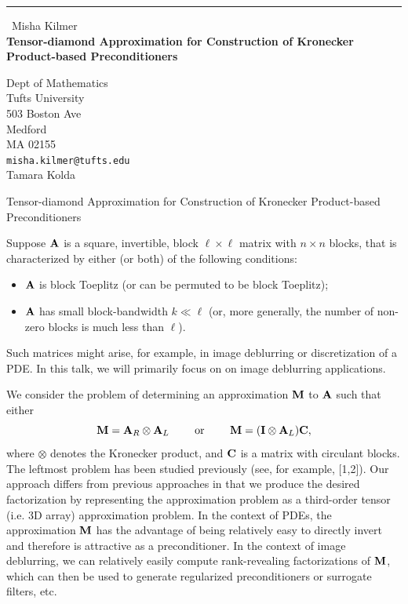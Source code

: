\documentclass{report}
\begin{document}
\begin{center}
\rule{6in}{1pt} \
{\large Misha Kilmer \\
{\bf Tensor-diamond Approximation for Construction of Kronecker Product-based Preconditioners }}

Dept of Mathematics \\ Tufts University \\ 503 Boston Ave \\ Medford \\ MA 02155
\\
{\tt misha.kilmer@tufts.edu}\\
Tamara Kolda\end{center}

\newcommand{\bfA}{{\bf A}}
\newcommand{\bfb}{{\bf b}}
\newcommand{\bfx}{{\bf x}}
\newcommand{\bfe}{{\bf e}}
\newcommand{\bfM}{{\bf M}}

\newcommand{\Mout}{\diamondsuit}


\newcommand{\M}[1]{{\bf {\boldmath {\MakeUppercase{#1}}}}}

\newcommand{\T}[1]{\boldsymbol{\cal {\MakeUppercase{#1}}}}


\newcommand{\TA}{\T{A}}


\begin{center} Tensor-diamond Approximation for Construction of Kronecker
Product-based Preconditioners \end{center}

Suppose $\bfA$ is a square, invertible, block $\ell \times \ell$ matrix
with $n \times n$ blocks, that is characterized by either (or both) of
the following
conditions:
\begin{itemize}
\item $\bfA$ is block Toeplitz (or can be permuted to be block Toeplitz);
\vspace*{-8pt}
\item $\bfA$ has small block-bandwidth $k \ll \ell$ (or, more generally,
the number of non-zero blocks is much less than $\ell$).
\end{itemize}
Such matrices might arise, for example, in image deblurring or
discretization of a PDE. In this talk, we will primarily focus on
on image deblurring applications.

We consider the problem of determining an approximation $\bfM$ to $\bfA$ such that either
\[ \bfM = \bfA_R \otimes \bfA_L \qquad \mbox{ or } \qquad \bfM = (\M{I}
\otimes \bfA_L)\M{C}, \]
where $\otimes$ denotes the Kronecker product, and $\M{C}$ is a matrix
with circulant blocks.
The leftmost problem has been studied previously (see, for example, [1,2]).
Our approach differs from previous approaches in that we produce the
desired factorization by representing
the approximation problem as a third-order tensor (i.e. 3D array) approximation problem.
In the context of PDEs, the approximation $\bfM$ has the advantage of
being relatively easy to directly invert and therefore is attractive as a
preconditioner.
In the context of image deblurring, we can relatively easily compute
rank-revealing factorizations of $\bfM$, which can then be used to
generate regularized preconditioners
or surrogate filters, etc.
\end{document}
